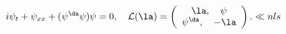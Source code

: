 \begin{equation}
i\psi_{t}+ \psi_{xx} +  (\psi^\da\psi)\psi=0,
      \quad
{\cal L}(\la)  = \left( \begin{array}{c} \la ,
\quad  \psi \\
\psi^\da, \quad -\la
    \end{array} \right).
\ll{nls}\end{equation}

